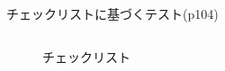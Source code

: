 \begin{frame}[shrink=20]{チェックリストに基づくテスト(p104)}
\begin{columns}[t]
\begin{column}{.35\textwidth}
        \begin{figure}
        \begin{center}
            \begin{overlayarea}{\textwidth}{0.6\textheight}
            \begin{center}
            \end{center}
            \end{overlayarea}
        \caption{チェックリスト}
        \end{center}
        \end{figure}
    \end{column}
\end{columns}
\end{frame}
